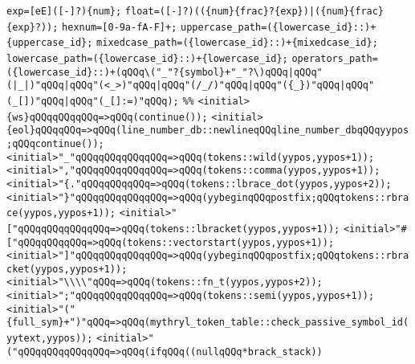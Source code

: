 \verb|exp=[eE]([-]?){num};|\newline
\verb|float=([-]?)(({num}{frac}?{exp})|\verb#|({num}{frac}{exp}?));#\newline
\verb|hexnum=[0-9a-fA-F]+;|\newline
\newline
\verb|uppercase_path=({lowercase_id}::)+{uppercase_id};|\newline
\verb|mixedcase_path=({lowercase_id}::)+{mixedcase_id};|\newline
\verb|lowercase_path=({lowercase_id}::)+{lowercase_id};|\newline
\verb|operators_path=({lowercase_id}::)+(qQQq\("_"?{symbol}+"_"?\)qQQq|\verb#|qQQq"(|_|)"qQQq|qQQq"(<_>)"qQQq|qQQq"(/_/)"qQQq|qQQq"({_})"qQQq|qQQq"(_[])"qQQq|qQQq"(_[]:=)"qQQq);#\newline
\newline
\verb|%%|\newline
\verb|<initial>{ws}qQQqqQQqqQQq=>qQQq(continue());|\newline
\verb|<initial>{eol}qQQqqQQq=>qQQq(line_number_db::newlineqQQqline_number_dbqQQqyypos;qQQqcontinue());|\newline
\verb|<initial>"_"qQQqqQQqqQQqqQQq=>qQQq(tokens::wild(yypos,yypos+1));|\newline
\verb|<initial>","qQQqqQQqqQQqqQQq=>qQQq(tokens::comma(yypos,yypos+1));|\newline
\verb|<initial>"{."qQQqqQQqqQQq=>qQQq(tokens::lbrace_dot(yypos,yypos+2));|\newline
\verb|<initial>"}"qQQqqQQqqQQqqQQq=>qQQq(yybeginqQQqpostfix;qQQqtokens::rbrace(yypos,yypos+1));|\newline
\verb|<initial>"["qQQqqQQqqQQqqQQq=>qQQq(tokens::lbracket(yypos,yypos+1));|\newline
\verb|<initial>"#["qQQqqQQqqQQq=>qQQq(tokens::vectorstart(yypos,yypos+1));|\newline
\verb|<initial>"]"qQQqqQQqqQQqqQQq=>qQQq(yybeginqQQqpostfix;qQQqtokens::rbracket(yypos,yypos+1));|\newline
\verb|<initial>"\\\\"qQQq=>qQQq(tokens::fn_t(yypos,yypos+2));|\newline
\verb|<initial>";"qQQqqQQqqQQqqQQq=>qQQq(tokens::semi(yypos,yypos+1));|\newline
\verb|<initial>"("{full_sym}+")"qQQq=>qQQq(mythryl_token_table::check_passive_symbol_id(yytext,yypos));|\newline
\verb|<initial>"("qQQqqQQqqQQqqQQq=>qQQq(ifqQQq((nullqQQq*brack_stack))|\newline
